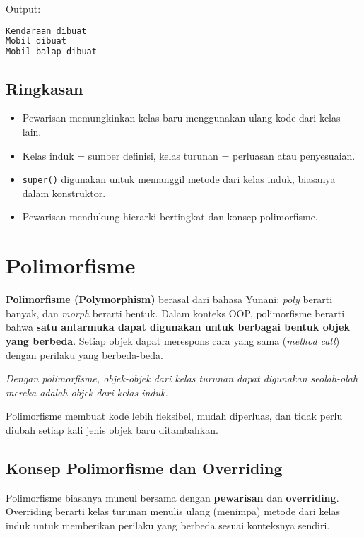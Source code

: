 Output:
\begin{lstlisting}[language=bash, caption={Output Program}]
Kendaraan dibuat
Mobil dibuat
Mobil balap dibuat
\end{lstlisting}

\subsection*{Ringkasan}
\begin{itemize}
    \item Pewarisan memungkinkan kelas baru menggunakan ulang kode dari kelas lain.
    \item Kelas induk = sumber definisi, kelas turunan = perluasan atau penyesuaian.
    \item \texttt{super()} digunakan untuk memanggil metode dari kelas induk, biasanya dalam konstruktor.
    \item Pewarisan mendukung hierarki bertingkat dan konsep polimorfisme.
\end{itemize}


\section{Polimorfisme}

\textbf{Polimorfisme (Polymorphism)} berasal dari bahasa Yunani: \emph{poly} berarti banyak, dan \emph{morph} berarti bentuk.  
Dalam konteks OOP, polimorfisme berarti bahwa \textbf{satu antarmuka dapat digunakan untuk berbagai bentuk objek yang berbeda}.  
Setiap objek dapat merespons cara yang sama (\emph{method call}) dengan perilaku yang berbeda-beda.

\begin{center}
\textit{Dengan polimorfisme, objek-objek dari kelas turunan dapat digunakan seolah-olah mereka adalah objek dari kelas induk.}
\end{center}

Polimorfisme membuat kode lebih fleksibel, mudah diperluas, dan tidak perlu diubah setiap kali jenis objek baru ditambahkan.

\subsection{Konsep Polimorfisme dan Overriding}

Polimorfisme biasanya muncul bersama dengan \textbf{pewarisan} dan \textbf{overriding}.  
Overriding berarti kelas turunan menulis ulang (menimpa) metode dari kelas induk untuk memberikan perilaku yang berbeda sesuai konteksnya sendiri.

